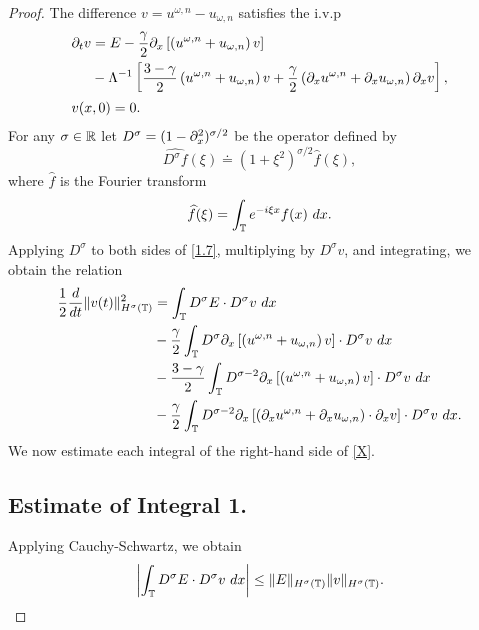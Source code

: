 \begin{proof} The difference $v = u^{\omega,n} - u_{\omega,n}$ satisfies 
the i.v.p
\begin{align}
\label{1.7}
& \p_t v  =  E - \frac{\gamma}{2} \p_x
\left[ \left( u^{\omega,n} + u_{\omega,n} \right)v \right]
\\
\notag & \phantom{\p_t v} - \Lambda^{-1} \left[
\frac{3-\gamma}{2} \left( u^{\omega,n} + u_{\omega,n}
\right) v +
\frac{\gamma}{2}\left( \p_x u^{\omega,n} +
\p_x u_{\omega,n}
\right) \p_x v
\right], \\
& v(x,0)=0.
\end{align}
For any $\sigma \in \mathbb{R}$ let   $D^\sigma=(1-\partial_x^2)^{\sigma/2}$ be the  operator
defined by 
%
$$ \widehat{D^\sigma f}(\xi) \doteq (1 + \xi^2)^{\sigma/2} \widehat{f}(\xi), $$
%
where $ \widehat{f}$ is the Fourier transform
%
$$ \widehat{f}(\xi) =  \int_{\mathbb{T}} e^{-i \xi x} f(x) \ dx.  $$
%
%
Applying $D^\sigma$ to both sides of \eqref{1.7}, multiplying by
$D^\sigma v$, and integrating, we obtain the
relation
%
%
\begin{equation}
\begin{split}
\frac{1}{2}\frac{d}{dt}\|v(t)\|_{H^\sigma(\mathbb{T})}^2
& = \int_{\mathbb{T}} D^\sigma E \cdot D^\sigma
v \ dx
\\
&-
\frac{\gamma}{2}\int_{\mathbb{T}} D^\sigma
\partial_x \left[ \left( u^{\omega,n} + u_{\omega,n} \right)v
\right]\cdot D^\sigma v \ dx
\\
& -
\frac{3-\gamma}{2}\int_{\mathbb{T}} D^{\sigma
-2} \partial_x \left[ \left( u^{\omega,n} + u_{\omega,n}
\right)v \right] \cdot D^\sigma v \ dx
\\
& - \frac{\gamma}{2}\int_{\mathbb{T}} D^{\sigma
-2}
\partial_x \left[ \left( \partial_x u^{\omega,n} + \partial_x u_{\omega,n}
\right)\cdot \partial_x v \right] \cdot
D^\sigma v \ dx.
\label{X}
\end{split}
\end{equation}
%
%
We now estimate each integral of the right-hand side
of \eqref{X}.
\subsection*{Estimate of Integral 1.} Applying Cauchy-Schwartz, we obtain
%
%
\begin{equation}
\begin{split}
\left |\int_{\mathbb{T}} D^\sigma E \cdot D^\sigma v \ dx \right |
\le \|E\|_{H^\sigma(\mathbb{T})} \|v\|_{H^\sigma(\mathbb{T})}.
\label{est_for_1}
\end{split}
\end{equation}
%
%
%

\end{proof}
